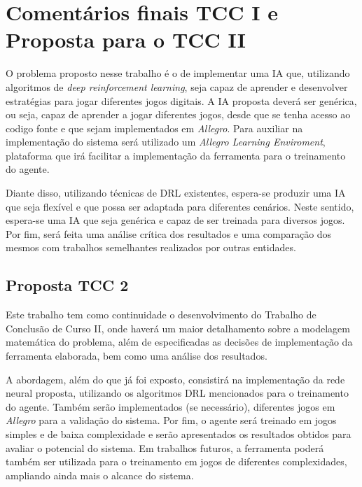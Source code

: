 \chapter{Comentários finais TCC I e Proposta para o TCC II}
\label{chap:conclusoes_tcc1}

O problema proposto nesse trabalho é o de implementar uma IA que, utilizando algoritmos de \textit{deep reinforcement learning}, seja capaz de aprender e desenvolver estratégias para jogar diferentes jogos digitais. A IA proposta deverá ser genérica, ou seja, capaz de aprender a jogar diferentes jogos, desde que se tenha acesso ao codigo fonte e que sejam implementados em \textit{Allegro}. Para auxiliar na implementação do sistema será utilizado um \textit{Allegro Learning Enviroment}, plataforma que irá facilitar a implementação da ferramenta para o treinamento do agente. 

Diante disso, utilizando técnicas de DRL existentes, espera-se produzir uma IA que seja flexível e que possa ser adaptada para diferentes cenários. Neste sentido, espera-se uma IA que seja genérica e capaz de ser treinada para diversos jogos. Por fim, será feita uma análise crítica dos resultados e uma comparação dos mesmos com trabalhos semelhantes realizados por outras entidades.

\section{Proposta TCC 2} %
\label{sec:proposta_de_continuidade}

Este trabalho tem como continuidade o desenvolvimento do Trabalho de Conclusão de Curso II, onde haverá um maior detalhamento sobre a modelagem matemática do problema, além de especificadas as decisões de implementação da ferramenta elaborada, bem como uma análise dos resultados.

A abordagem, além do que já foi exposto, consistirá na implementação da rede neural proposta, utilizando os algoritmos DRL mencionados para o treinamento do agente. Também serão implementados (se necessário), diferentes jogos em \textit{Allegro} para a validação do sistema. Por fim, o agente será treinado em jogos simples e de baixa complexidade e serão apresentados os resultados obtidos para avaliar o potencial do sistema. Em trabalhos futuros, a ferramenta poderá também ser utilizada para o treinamento em jogos de diferentes complexidades, ampliando ainda mais o alcance do sistema.

